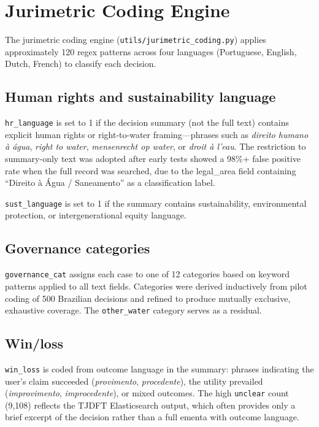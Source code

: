 \documentclass[12pt]{article}
\begin{document}
\section{Jurimetric Coding Engine}
\label{sec:coding}

The jurimetric coding engine (\texttt{utils/jurimetric\_coding.py}) applies approximately 120 regex patterns across four languages (Portuguese, English, Dutch, French) to classify each decision.

\subsection{Human rights and sustainability language}

\texttt{hr\_language} is set to 1 if the decision summary (not the full text) contains explicit human rights or right-to-water framing—phrases such as \emph{direito humano à água}, \emph{right to water}, \emph{mensenrecht op water}, or \emph{droit à l'eau}. The restriction to summary-only text was adopted after early tests showed a 98\%+ false positive rate when the full record was searched, due to the legal\_area field containing ``Direito à Água / Saneamento'' as a classification label.

\texttt{sust\_language} is set to 1 if the summary contains sustainability, environmental protection, or intergenerational equity language.

\subsection{Governance categories}

\texttt{governance\_cat} assigns each case to one of 12 categories based on keyword patterns applied to all text fields. Categories were derived inductively from pilot coding of 500 Brazilian decisions and refined to produce mutually exclusive, exhaustive coverage. The \texttt{other\_water} category serves as a residual.

\subsection{Win/loss}

\texttt{win\_loss} is coded from outcome language in the summary: phrases indicating the user's claim succeeded (\emph{provimento}, \emph{procedente}), the utility prevailed (\emph{improvimento}, \emph{improcedente}), or mixed outcomes. The high \texttt{unclear} count (9,108) reflects the TJDFT Elasticsearch output, which often provides only a brief excerpt of the decision rather than a full ementa with outcome language.
\end{document}
